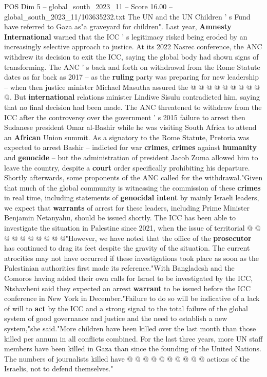 \begin{textsample}{POS Dim 5 – global\_south\_2023\_11 – Score 16.00 – global\_south\_2023\_11/103635232.txt}
The UN and the UN Children ' s Fund have referred to Gaza as"a graveyard for children".
Last year, \textbf{Amnesty} \textbf{International} warned that the ICC ' s legitimacy risked being eroded by an increasingly selective approach to justice.
At its 2022 Nasrec conference, the ANC withdrew its decision to exit the ICC, saying the global body had shown signs of transforming.
The ANC ' s back and forth on withdrawal from the Rome Statute dates as far back as 2017 -- as the \textbf{ruling} party was preparing for new leadership -- when then justice minister Michael Masutha assured the @ @ @ @ @ @ @ @ @ @.
But \textbf{international} relations minister Lindiwe Sisulu contradicted him, saying that no final decision had been made.
The ANC threatened to withdraw from the ICC after the controversy over the government ' s 2015 failure to arrest then Sudanese president Omar al-Bashir while he was visiting South Africa to attend an \textbf{African} Union summit.
As a signatory to the Rome Statute, Pretoria was expected to arrest Bashir -- indicted for war \textbf{crimes}, \textbf{crimes} against \textbf{humanity} and \textbf{genocide} -- but the administration of president Jacob Zuma allowed him to leave the country, despite a \textbf{court} order specifically prohibiting his departure.
Shortly afterwards, some proponents of the ANC called for the withdrawal."Given that much of the global community is witnessing the commission of these \textbf{crimes} in real time, including statements of \textbf{genocidal} \textbf{intent} by mainly Israeli leaders, we expect that \textbf{warrants} of arrest for these leaders, including Prime Minister Benjamin Netanyahu, should be issued shortly.
The ICC has been able to investigate the situation in Palestine since 2021, when the issue of territorial @ @ @ @ @ @ @ @ @ @"However, we have noted that the office of the \textbf{prosecutor} has continued to drag its feet despite the gravity of the situation.
The current atrocities may not have occurred if these investigations took place as soon as the Palestinian authorities first made its reference."With Bangladesh and the Comoros having added their own calls for Israel to be investigated by the ICC, Ntshavheni said they expected an arrest \textbf{warrant} to be issued before the ICC conference in New York in December."Failure to do so will be indicative of a lack of will to \textbf{act} by the ICC and a strong signal to the total failure of the global system of good governance and justice and the need to establish a new system,"she said."More children have been killed over the last month than those killed per annum in all conflicts combined.
For the last three years, more UN staff members have been killed in Gaza than since the founding of the United Nations.
The numbers of journalists killed have @ @ @ @ @ @ @ @ @ @ actions of the Israelis, not to defend themselves."

\end{textsample}
